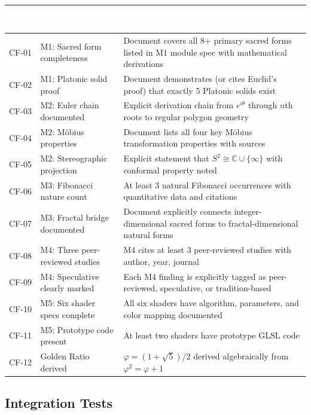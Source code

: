 \documentclass[11pt,letterpaper]{article}
\newcommand{\tableheader}[1]{\textbf{\sffamily\textcolor{white}{#1}}}
\begin{document}
\begin{center}
\begin{tabularx}{\textwidth}{C{1.5cm}L{4cm}X}
\toprule
{}
\tableheader{Test ID} & \tableheader{Verifies} & \tableheader{Expected Behavior} \\
\midrule
CF-01 & M1: Sacred form completeness & Document covers all 8+ primary sacred forms listed in M1 module spec with mathematical derivations \\
CF-02 & M1: Platonic solid proof & Document demonstrates (or cites Euclid's proof) that exactly 5 Platonic solids exist \\
CF-03 & M2: Euler chain documented & Explicit derivation chain from $e^{i\theta}$ through $n$th roots to regular polygon geometry \\
CF-04 & M2: M\"{o}bius properties & Document lists all four key M\"{o}bius transformation properties with sources \\
CF-05 & M2: Stereographic projection & Explicit statement that $S^2 \cong \mathbb{C} \cup \{\infty\}$ with conformal property noted \\
CF-06 & M3: Fibonacci nature count & At least 3 natural Fibonacci occurrences with quantitative data and citations \\
CF-07 & M3: Fractal bridge documented & Document explicitly connects integer-dimensional sacred forms to fractal-dimensional natural forms \\
CF-08 & M4: Three peer-reviewed studies & M4 cites at least 3 peer-reviewed studies with author, year, journal \\
CF-09 & M4: Speculative clearly marked & Each M4 finding is explicitly tagged as peer-reviewed, speculative, or tradition-based \\
CF-10 & M5: Six shader specs complete & All six shaders have algorithm, parameters, and color mapping documented \\
CF-11 & M5: Prototype code present & At least two shaders have prototype GLSL code \\
CF-12 & Golden Ratio derived & $\varphi = (1+\sqrt{5})/2$ derived algebraically from $\varphi^2 = \varphi + 1$ \\
\bottomrule
\end{tabularx}
\end{center}

\subsection{Integration Tests}
\end{document}
